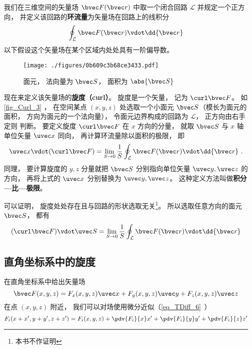 

我们在三维空间的矢量场 $\bvec F(\bvec r)$ 中取一个闭合回路 $\mathcal L$ 并规定一个正方向， 并定义该回路的\textbf{环流量}为矢量场在回路上的线积分
\begin{equation}
\oint_{\mathcal L} \bvec F(\bvec r) \vdot \dd{\bvec r}
\end{equation}
以下假设这个矢量场在某个区域内处处具有一阶偏导数。

\begin{figure}[ht]
\centering
\texttt{[image: ./figures/0b609c3b68ce3433.pdf]}
\caption{面元， 法向量为 $\bvec S$， 面积为 $\abs{\bvec S}$}\label{fig_Curl_3}
\end{figure}

现在来定义该矢量场的\textbf{旋度（curl）}。 旋度是一个矢量， 记为 $\curl \bvec F$。 如\autoref{fig_Curl_3} ， 在空间某点 $(x,y,z)$ 处选取一个小面元 $\bvec S$（模长为面元的面积， 方向为面元的一个法向量）， 令面元边界构成的回路为 $\mathcal L$， 正方向由右手定则 判断。 要定义旋度 $\curl \bvec F$ 在 $x$ 方向的分量， 就取 $\bvec S$ 与 $x$ 轴单位矢量 $\uvec x$ 同向， 再计算环流量除以面积的极限， 即
\begin{equation}
\uvec x \vdot (\curl\bvec F) = \lim_{S\to 0} \frac 1S \oint_{\mathcal L} \bvec F(\bvec r) \vdot \dd{\bvec r}~.
\end{equation}
同理， 要计算旋度的 $y, z$ 分量就把 $\bvec S$ 分别指向单位矢量 $\uvec y, \uvec z$ 的方向， 再将上式的 $\uvec x$ 分别替换为 $\uvec y, \uvec z$。 这种定义方法叫做\textbf{积分—比—极限}。

可以证明， 旋度处处存在且与回路的形状选取无关\footnote{本书不作证明}。 所以选取任意方向的面元 $\bvec S$， 都有
\begin{equation}\label{eq_Curl_3}
(\curl\bvec F) \vdot \uvec S = \lim_{S\to 0} \frac 1S \oint_{\mathcal L} \bvec F(\bvec r) \vdot \dd{\bvec r}
\end{equation}

\subsection{直角坐标系中的旋度}
在直角坐标系中给出矢量场
\begin{equation}
\bvec F(x,y,z) = F_x(x,y,z)\uvec x + F_y(x,y,z)\uvec y + F_z(x,y,z)\uvec z
\end{equation}
在点 $(x,y,z)$ 附近， 我们可以对场使用微分近似（\autoref{eq_TDiff_6}~）
\begin{equation}
F_i(x+x', y+y', z+z') = F_i(x,y,z) + \pdv{F_i}{x}x' + \pdv{F_i}{y}y' + \pdv{F_i}{z}z'
\end{equation}

